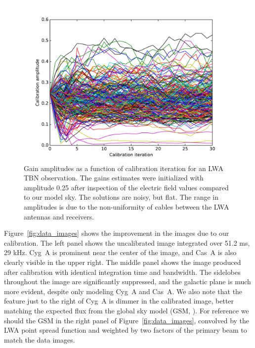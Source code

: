 \documentclass[a4paper,fleqn,usenatbib]{mnras}
\begin{document}
\begin{figure}
\begin{center}
\includegraphics[width=\columnwidth]{fig7.pdf}
\caption{Gain amplitudes as a function of calibration iteration for an LWA TBN observation. The 
gains estimates were initialized with amplitude 0.25 after inspection of the electric field values 
compared to our model sky. The solutions are noisy, but flat. The range in amplitudes is due to 
the non-uniformity of cables between the LWA antennas and receivers.
}
\label{fig:data_amp}
\end{center}
\end{figure}

Figure~\ref{fig:data_images} shows the improvement in the images due to our calibration. The 
left panel shows the uncalibrated image integrated over 51.2 ms, 29 kHz. Cyg~A is prominent 
near the center of the image, and Cas~A is also clearly visible in the upper right. The middle 
panel shows the image produced after calibration with identical integration time and bandwidth. 
The sidelobes throughout the image are significantly suppressed, and the galactic plane is 
much more evident, despite only modeling Cyg~A and Cas~A. We also note that the feature 
just to the right of Cyg~A is dimmer in the calibrated image, better matching the expected flux 
from the global sky model (GSM, \citealt{deo08}). 
For reference we should the GSM \citep{pri16} in the right panel of 
Figure~\ref{fig:data_images}, convolved by the LWA point spread function and weighted
by  two factors of the primary beam to match the data images.
\end{document}

